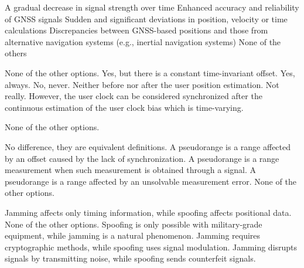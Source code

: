\begin{questions}
    \begin{checkboxes}
        \choice A gradual decrease in signal strength over time
        \choice Enhanced accuracy and reliability of GNSS signals
        \CorrectChoice Sudden and significant deviations in position, velocity or time calculations
        \CorrectChoice Discrepancies between GNSS-based positions and those from alternative navigation systems (e.g., inertial navigation systems)
        \choice None of the others
    \end{checkboxes}


    \begin{checkboxes}
        \choice None of the other options.
        \choice Yes, but there is a constant time-invariant offset.
        \choice Yes, always.
        \choice No, never. Neither before nor after the user position estimation.
        \CorrectChoice Not really. However, the user clock can be considered synchronized after the
        continuous estimation of the user clock bias which is time-varying.
    \end{checkboxes}

    \begin{checkboxes}
        \choice None of the other options.
    \end{checkboxes}


    \begin{checkboxes}
        \choice No difference, they are equivalent definitions.
        \CorrectChoice A pseudorange is a range affected by an offset caused by the lack of synchronization.
        \choice A pseudorange is a range measurement when such measurement is obtained through a signal.
        \choice A pseudorange is a range affected by an unsolvable measurement error.
        \choice None of the other options.
    \end{checkboxes}

    \begin{checkboxes}
        \choice Jamming affects only timing information, while spoofing affects positional data.
        \choice None of the other options.
        \choice Spoofing is only possible with military-grade equipment, while jamming is a natural phenomenon.
        \choice Jamming requires cryptographic methods, while spoofing uses signal modulation.
        \CorrectChoice Jamming disrupts signals by transmitting noise, while spoofing sends counterfeit signals.
    \end{checkboxes}


\end{questions}
